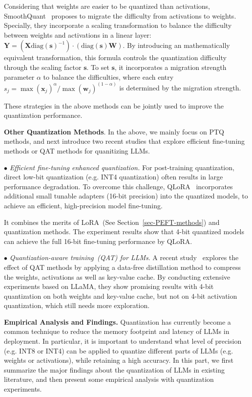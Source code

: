 {Considering that weights are easier to be quantized than activations, SmoothQuant~\cite{Xiao-CoRR-2022-SmoothQuant}  proposes to migrate the difficulty from  activations to weights. Specially, they incorporate a scaling transformation  to balance the difficulty between weights and activations in a linear layer: $\mathbf{Y} = (\mathbf{X}\text{diag}(\mathbf{s})^{-1}) \cdot (\text{diag}(\mathbf{s})\mathbf{W})$. 
By introducing an mathematically equivalent transformation, this formula  controls the quantization difficulty through the scaling factor $\mathbf{s}$. 
To set $\mathbf{s}$, it  incorporates a migration strength parameter $\alpha$ to balance the difficulties,  where each entry $s_j=\max(\mathbf{x}_j)^\alpha / \max(\mathbf{w}_j)^{(1-\alpha)}$ is determined by  the migration strength.  

These strategies in the above methods can be jointly used to improve the quantization performance. 

\textbf{Other Quantization Methods}. In the above, we mainly focus on PTQ methods, and next introduce two recent studies that explore efficient fine-tuning methods or QAT methods   for quanitizing LLMs. 

$\bullet$ \emph{Efficient fine-tuning enhanced quantization.} For post-training quantization, direct low-bit  quantization (e.g. INT4 quantization) often results in large performance degradation.  To overcome this challenge, QLoRA~\cite{Dettmers-CoRR-2023-QLoRA} incorporates additional small tunable  adapters (16-bit precision) into the quantized models,  to achieve an efficient, high-precision model fine-tuning.  

It combines the merits of LoRA~(See Section~\ref{sec-PEFT-methods}) and quantization methods. The experiment results show that 4-bit quantized  models can achieve the full 16-bit fine-tuning performance by QLoRA.

$\bullet$ \emph{Quantization-aware training~(QAT) for LLMs}. A recent study~\cite{liu-2023-arxiv-LLM-QAT} explores the effect of QAT methods by applying a data-free distillation method to compress the weights, activations as well as key-value cache. By conducting extensive experiments based on LLaMA, they show promising results with 4-bit quantization on both weights and key-value cache, but not on 4-bit activation quantization, which still needs more exploration. 

\label{sec:quantization_empirical}
\textbf{{Empirical Analysis and Findings}.} Quantization has currently become a common technique to reduce the memory footprint and latency of LLMs in deployment. In particular, it is important to understand what level of precision (e.g. INT8 or INT4) can be applied to quantize different parts of LLMs (e.g. weights or activations), while retaining  a high accuracy. In this part, we first summarize the major findings about the quantization of LLMs in existing literature, and then present some empirical analysis with quantization experiments.  

}
